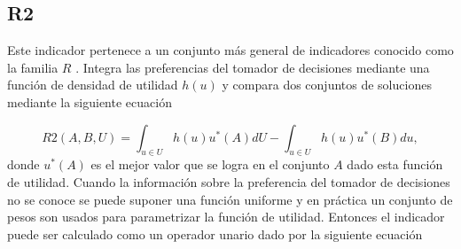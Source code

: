 

\subsection{R2} \label{sec:R2}
Este indicador pertenece a un conjunto más general de indicadores conocido como la familia $R$ \cite{R2}. Integra las preferencias del tomador de decisiones mediante una función de densidad de utilidad $h(u)$ y compara dos conjuntos de soluciones mediante la siguiente ecuación

\begin{equation} 
    R2(A,B,U)=\int_{u\in U} h(u)u^*(A) dU- \int_{u\in U} h(u) u^*(B)du, \nonumber
\end{equation}
donde  $u^*(A)$ es el mejor valor que se logra en el conjunto $A$ dado esta función de utilidad. Cuando la información sobre la preferencia del tomador de decisiones no se conoce se puede suponer una función uniforme y en práctica un conjunto de pesos son usados para parametrizar la función de utilidad. Entonces el indicador puede ser calculado como un operador unario dado por la siguiente ecuación

